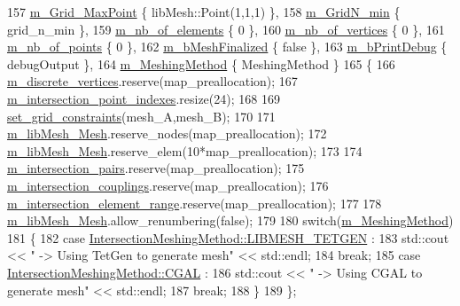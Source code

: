 \begin{DoxyCode}
157         \hyperlink{classcarl_1_1_mesh___intersection_a98f86004df38485ed880b054b94f5c7d}{m\_Grid\_MaxPoint} \{ libMesh::Point(1,1,1) \},
158         \hyperlink{classcarl_1_1_mesh___intersection_af5d973b0c2505d89bf1c9f7b29585b80}{m\_GridN\_min} \{ grid\_n\_min \},
159         \hyperlink{classcarl_1_1_mesh___intersection_acd2052a59c0bc759f86b3e4810093a54}{m\_nb\_of\_elements} \{ 0 \},
160         \hyperlink{classcarl_1_1_mesh___intersection_ac2765c9bdf5f15878a1cff52db5551aa}{m\_nb\_of\_vertices} \{ 0 \},
161         \hyperlink{classcarl_1_1_mesh___intersection_a64c49bef515c3b09edf6745d079056a2}{m\_nb\_of\_points} \{ 0 \},
162         \hyperlink{classcarl_1_1_mesh___intersection_ae858bc08b5286b0562eaf94372944bcd}{m\_bMeshFinalized} \{ \textcolor{keyword}{false} \},
163         \hyperlink{classcarl_1_1_mesh___intersection_a086fd53554e5ecfad25b7b15012d71e4}{m\_bPrintDebug} \{ debugOutput \},
164         \hyperlink{classcarl_1_1_mesh___intersection_aa42a12f25859de7ce08655a1ada87e50}{m\_MeshingMethod} \{ MeshingMethod \}
165     \{
166         \hyperlink{classcarl_1_1_mesh___intersection_a5c5abcce2f778e50c5c8a5265692c96f}{m\_discrete\_vertices}.reserve(map\_preallocation);
167         \hyperlink{classcarl_1_1_mesh___intersection_aac5e4b495b7d8aa532ce28ca2d495c69}{m\_intersection\_point\_indexes}.resize(24);
168 
169         \hyperlink{classcarl_1_1_mesh___intersection_ace934a9b46e71e7071566b448474a5aa}{set\_grid\_constraints}(mesh\_A,mesh\_B);
170 
171         \hyperlink{classcarl_1_1_mesh___intersection_aeea7835637a936ca4f272e48cea18fa2}{m\_libMesh\_Mesh}.reserve\_nodes(map\_preallocation);
172         \hyperlink{classcarl_1_1_mesh___intersection_aeea7835637a936ca4f272e48cea18fa2}{m\_libMesh\_Mesh}.reserve\_elem(10*map\_preallocation);
173 
174         \hyperlink{classcarl_1_1_mesh___intersection_a06a4d0d633bf58594fee6e35ebbc1b97}{m\_intersection\_pairs}.reserve(map\_preallocation);
175         \hyperlink{classcarl_1_1_mesh___intersection_ab0d6f92956f02022cfdfb2e3b84e1676}{m\_intersection\_couplings}.reserve(map\_preallocation);
176         \hyperlink{classcarl_1_1_mesh___intersection_adcbc0fb898aa287c2ff2a13693daf572}{m\_intersection\_element\_range}.reserve(map\_preallocation);
177 
178         \hyperlink{classcarl_1_1_mesh___intersection_aeea7835637a936ca4f272e48cea18fa2}{m\_libMesh\_Mesh}.allow\_renumbering(\textcolor{keyword}{false});
179 
180         \textcolor{keywordflow}{switch}(\hyperlink{classcarl_1_1_mesh___intersection_aa42a12f25859de7ce08655a1ada87e50}{m\_MeshingMethod})
181         \{
182         \textcolor{keywordflow}{case} \hyperlink{namespacecarl_a4f72fd25137b97ac1ca1276ec549e5cfa0a91b3dbac7fab7e5efa6f804aab8f58}{IntersectionMeshingMethod::LIBMESH\_TETGEN} :
183             std::cout << \textcolor{stringliteral}{" -> Using TetGen to generate mesh"} << std::endl;
184             \textcolor{keywordflow}{break};
185         \textcolor{keywordflow}{case} \hyperlink{namespacecarl_a4f72fd25137b97ac1ca1276ec549e5cfa509162a828acac7eaad1fc369696a3b1}{IntersectionMeshingMethod::CGAL} :
186             std::cout << \textcolor{stringliteral}{" -> Using CGAL to generate mesh"} << std::endl;
187             \textcolor{keywordflow}{break};
188         \}
189     \};
\end{DoxyCode}


